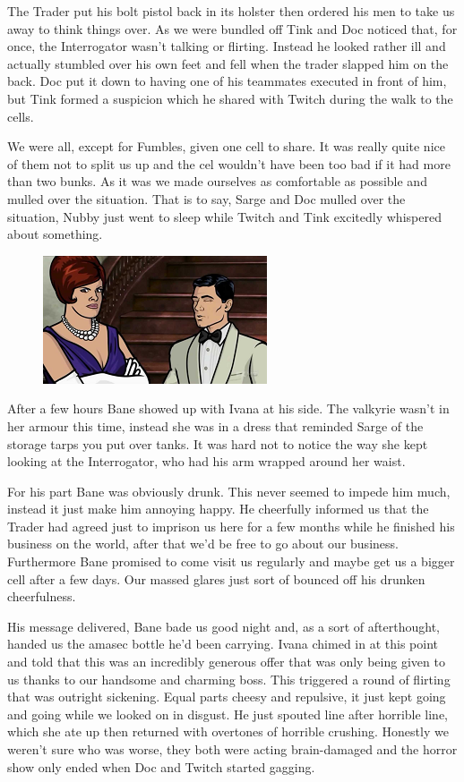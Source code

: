 The Trader put his bolt pistol back in its holster then ordered his men to take us away to think things over. 
As we were bundled off Tink and Doc noticed that, for once, the Interrogator wasn't talking or flirting. 
Instead he looked rather ill and actually stumbled over his own feet and fell when the trader slapped him on the back. 
Doc put it down to having one of his teammates executed in front of him, but Tink formed a suspicion which he shared with Twitch during the walk to the cells.

We were all, except for Fumbles, given one cell to share. 
It was really quite nice of them not to split us up and the cel wouldn't have been too bad if it had more than two bunks. 
As it was we made ourselves as comfortable as possible and mulled over the situation. 
That is to say, Sarge and Doc mulled over the situation, Nubby just went to sleep while Twitch and Tink excitedly whispered about something.

\begin{figure}
	\begin{center}
		\includegraphics[width=\figwidth]{pics/9/42.png}
	\end{center}
\end{figure}
After a few hours Bane showed up with Ivana at his side. 
The valkyrie wasn't in her armour this time, instead she was in a dress that reminded Sarge of the storage tarps you put over tanks. 
It was hard not to notice the way she kept looking at the Interrogator, who had his arm wrapped around her waist.

For his part Bane was obviously drunk. 
This never seemed to impede him much, instead it just make him annoying happy. 
He cheerfully informed us that the Trader had agreed just to imprison us here for a few months while he finished his business on the world, after that we'd be free to go about our business. 
Furthermore Bane promised to come visit us regularly and maybe get us a bigger cell after a few days. 
Our massed glares just sort of bounced off his drunken cheerfulness.

His message delivered, Bane bade us good night and, as a sort of afterthought, handed us the amasec bottle he'd been carrying. 
Ivana chimed in at this point and told that this was an incredibly generous offer that was only being given to us thanks to our handsome and charming boss. 
This triggered a round of flirting that was outright sickening. 
Equal parts cheesy and repulsive, it just kept going and going while we looked on in disgust. 
He just spouted line after horrible line, which she ate up then returned with overtones of horrible crushing. 
Honestly we weren't sure who was worse, they both were acting brain-damaged and the horror show only ended when Doc and Twitch started gagging.

